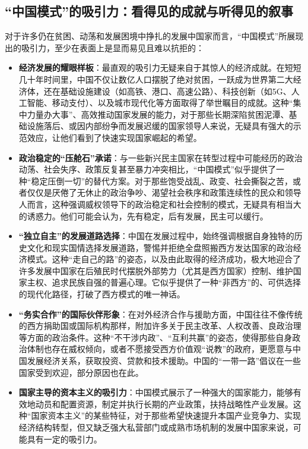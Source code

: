\documentclass[UTF8, 10pt]{ctexbook}
\begin{document}
\subsection{“中国模式”的吸引力：看得见的成就与听得见的叙事}
对于许多仍在贫困、动荡和发展困境中挣扎的发展中国家而言，“中国模式”所展现出的吸引力，至少在表面上是显而易见且难以抗拒的：
\begin{itemize}
    \item \textbf{经济发展的耀眼样板}：最直观的吸引力无疑来自于其惊人的经济成就。在短短几十年时间里，中国不仅让数亿人口摆脱了绝对贫困，一跃成为世界第二大经济体，还在基础设施建设（如高铁、港口、高速公路）、科技创新（如5G、人工智能、移动支付）、以及城市现代化等方面取得了举世瞩目的成就。这种“集中力量办大事”、高效推动国家发展的能力，对于那些长期深陷贫困泥潭、基础设施落后、或因内部纷争而发展迟缓的国家领导人来说，无疑具有强大的示范效应，让他们看到了快速实现国家崛起的希望。
    \item \textbf{政治稳定的“压舱石”承诺}：与一些新兴民主国家在转型过程中可能经历的政治动荡、社会失序、政策反复甚至暴力冲突相比，“中国模式”似乎提供了一种“稳定压倒一切”的替代方案。对于那些饱受战乱、政变、社会撕裂之苦，或者仅仅是厌倦了无休止的政治争吵、渴望社会秩序和政策连续性的民众和领导人而言，这种强调威权领导下的政治稳定和社会控制的模式，无疑具有相当大的诱惑力。他们可能会认为，先有稳定，后有发展，民主可以缓行。
    \item \textbf{“独立自主”的发展道路选择}：中国在发展过程中，始终强调根据自身独特的历史文化和现实国情选择发展道路，警惕并拒绝全盘照搬西方发达国家的政治经济模式。这种“走自己的路”的姿态，以及由此取得的经济成功，极大地迎合了许多发展中国家在后殖民时代摆脱外部势力（尤其是西方国家）控制、维护国家主权、追求民族自强的普遍心理。它似乎提供了一种“非西方”的、可供选择的现代化路径，打破了西方模式的唯一神话。
    \item \textbf{“务实合作”的国际伙伴形象}：在对外经济合作与援助方面，中国往往不像传统的西方捐助国或国际机构那样，附加许多关于民主改革、人权改善、良政治理等方面的政治条件。这种“不干涉内政”、“互利共赢”的姿态，使得那些自身政治体制也存在威权倾向，或者不愿接受西方价值观“说教”的政府，更愿意与中国发展经济关系，获取投资、贷款和技术援助。中国的“一带一路”倡议在一些国家受到欢迎，部分原因也在此。
    \item \textbf{国家主导的资本主义的吸引力}：中国模式展示了一种强大的国家能力，能够有效地动员和配置资源，制定并执行长期的产业政策，扶持战略性产业发展。这种“国家资本主义”的某些特征，对于那些希望快速提升本国产业竞争力、实现经济结构转型，但又缺乏强大私营部门或成熟市场机制的发展中国家来说，可能具有一定的吸引力。
\end{itemize}
\end{document}
